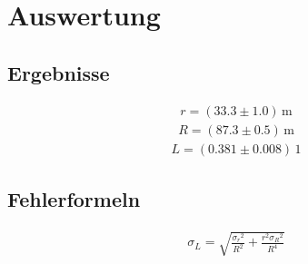 \documentclass[a4paper,10pt]{scrbook}
\begin{document}
\section*{Auswertung}

\subsection*{Ergebnisse}

\begin{align*}
r = (33.3\pm 1.0)\,\mathrm{m}
\end{align*}
\begin{align*}
R = (87.3\pm 0.5)\,\mathrm{m}
\end{align*}
\begin{align*}
L = (0.381\pm 0.008)\,\mathrm{1}
\end{align*}


\subsection*{Fehlerformeln}

\begin{align*}\sigma_{L}=\sqrt{\frac{{\sigma_{{r}}}^{2}}{R^{2}} + \frac{r^{2} {\sigma_{{R}}}^{2}}{R^{4}}}\end{align*}
\end{document}
